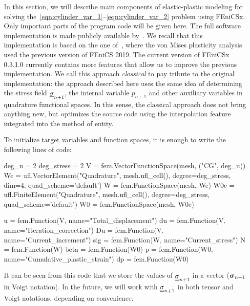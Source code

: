 \documentclass[12pt]{article}
\begin{document}
In this section, we will describe main components of elastic-plastic modeling for solving the~\eqref{eqn:cylinder_var_1}--\eqref{eqn:cylinder_var_2} problem using FEniCSx. Only important parts of the program code will be given here. The full software implementation is made publicly available by~\parencite{convex-plasticity}. We recall that this implementation is based on the one of~\textcite{bleyer2018numericaltours}, where the von Mises plasticity analysis used the previous version of FEniCS 2019. The current version of FEniCSx 0.3.1.0 currently contains more features that allow us to improve the previous implementation. We call this approach \textit{classical} to pay tribute to the original implementation: the approach described here uses the same idea of determining the stress field $\underline{\underline{\sigma}}_{n+1}$, the internal variable $p_{n+1}$ and other auxiliary variables in quadrature functional spaces. In this sense, the classical approach does not bring anything new, but optimizes the source code using the interpolation feature integrated into the  method of  entity.

To initialize target variables and function spaces, it is enough to write the following lines of code:

\begin{pythoncode}
    deg_u = 2
    deg_stress = 2
    V = fem.VectorFunctionSpace(mesh, ("CG", deg_u))
    We = ufl.VectorElement("Quadrature", mesh.ufl_cell(), degree=deg_stress, dim=4, quad_scheme='default')
    W = fem.FunctionSpace(mesh, We)
    W0e = ufl.FiniteElement("Quadrature", mesh.ufl_cell(), degree=deg_stress, quad_scheme='default')
    W0 = fem.FunctionSpace(mesh, W0e)

    u = fem.Function(V, name="Total_displacement")
    du = fem.Function(V, name="Iteration_correction")
    Du = fem.Function(V, name="Current_increment")
    sig = fem.Function(W, name="Current_stress")
    N = fem.Function(W)
    beta = fem.Function(W0)
    p = fem.Function(W0, name="Cumulative_plastic_strain")
    dp = fem.Function(W0)
\end{pythoncode}

It can be seen from this code that we store the values of $\underline{\underline{\sigma}}_{n+1}$ in a vector  ($\mbox{\boldmath $\sigma$}_{n+1}$ in Voigt notation). In the future, we will work with $\underline{\underline{\sigma}}_{n+1}$ in both tensor and Voigt notations, depending on convenience.
\end{document}
